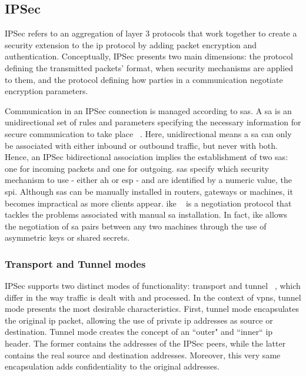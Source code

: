 \documentclass[11pt,twoside,a4paper]{report}
\begin{document}
\subsection{IPSec}

IPSec refers to an aggregation of layer 3 protocols that work together to create a security extension to the \ac{ip} protocol by adding packet encryption and authentication. Conceptually, IPSec presents two main dimensions: the protocol defining the transmitted packets' format, when security mechanisms are applied to them, and the protocol defining how parties in a communication negotiate encryption parameters.

Communication in an IPSec connection is managed according to \acp{sa}. A \ac{sa} is an unidirectional set of rules and parameters specifying the necessary information for secure communication to take place ~\cite{rfc4301}. Here, unidirectional means a \ac{sa} can only be associated with either inbound or outbound traffic, but never with both. Hence, an IPSec bidirectional association implies the establishment of two \acp{sa}: one for incoming packets and one for outgoing. \acp{sa} specify which security mechanism to use - either \ac{ah} or \ac{esp} - and are identified by a numeric value, the \ac{spi}. Although \ac{sa}s can be manually installed in routers, gateways or machines, it becomes impractical as more clients appear. \ac{ike} ~\cite{rfc7296} is a negotiation protocol that tackles the problems associated with manual \ac{sa} installation. In fact, \ac{ike} allows the negotiation of \ac{sa} pairs between any two machines through the use of asymmetric keys or shared secrets.

\subsubsection{Transport and Tunnel modes}

IPSec supports two distinct modes of functionality: transport and tunnel ~\cite{rfc4301}, which differ in the way traffic is dealt with and processed. In the context of \ac{vpn}s, tunnel mode presents the
most desirable characteristics. First, tunnel mode encapsulates the original \ac{ip} packet, allowing the use of private \ac{ip} addresses as source or destination. Tunnel mode creates the concept of an ``outer" and ``inner`` \ac{ip} header. The former contains the addresses of the IPSec peers, while the latter contains the real source and destination addresses. Moreover, this very same encapsulation adds confidentiality to the original addresses.
\end{document}
